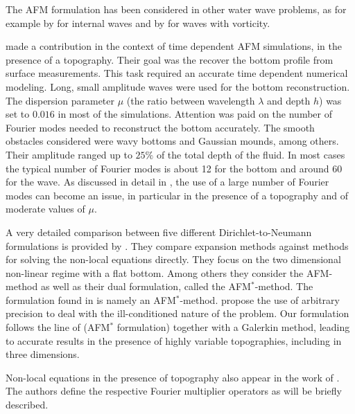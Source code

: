 \documentclass[11pt]{article}
\begin{document}
The AFM formulation has been considered in other water wave problems, as for example by
\citet{AblowitzHaut} for internal waves and by \cite{AshtonFokas} for waves with vorticity.

\citet{VasanDeconinck} made a contribution in the context of time dependent AFM simulations, 
in the presence of a topography. Their goal was the recover the bottom profile 
from surface measurements. This task required  an accurate time dependent numerical modeling.
Long, small amplitude waves were used for the bottom reconstruction. 
The dispersion parameter $\mu$ (the ratio between wavelength $\lambda$ and depth $h$) was set to $0.016$ 
in most of the simulations.
Attention was paid on the number of Fourier modes needed to reconstruct the bottom accurately. 
The smooth obstacles considered were wavy bottoms and Gaussian mounds, among others. Their amplitude 
ranged up to $25\%$ of the total depth of the fluid. 
In most cases the typical number of Fourier modes is about 12 for the bottom and around 60 for the wave. 
As  discussed in detail in \citet{VasanDeconinck}, the use of a large number of Fourier modes can become an issue, in 
particular in the presence of a topography and of moderate values of $\mu$.

A very detailed comparison between five different  
Dirichlet-to-Neumann formulations  is provided by \citet{WilkeningVasan}. 
They compare expansion methods against methods for solving the non-local equations directly. 
They focus on the two dimensional non-linear regime with a flat bottom.
Among others they consider the AFM-method as well as their dual formulation,
called the AFM$^*$-method. The formulation found in  \citet{Paul1998,CSNG} is namely an AFM$^*$-method. 
\citet{WilkeningVasan} propose the use of  arbitrary precision to deal with the ill-conditioned nature of the problem. 
Our formulation follows the line of \cite{Paul1998} (AFM$^*$ formulation) together with a Galerkin method,
leading to accurate results in the presence of highly variable topographies, including in three dimensions. 


Non-local equations in the presence of topography also appear in the work of \citet{CSNG}. The authors define the 
respective Fourier multiplier operators as will be briefly described.
\end{document}
